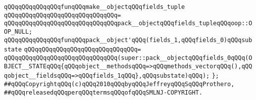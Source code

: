 \newline
\verb|qQQqqQQqqQQqqQQqfunqQQqmake__objectqQQqfields_tuple|\newline
\verb|qQQqqQQqqQQqqQQqqQQqqQQqqQQqqQQq=|\newline
\verb|qQQqqQQqqQQqqQQqqQQqqQQqqQQqqQQqpack__objectqQQqfields_tupleqQQqoop::OOP_NULL;|\newline
\newline
\verb|qQQqqQQqqQQqqQQqfunqQQqpack__object'qQQq(fields_1,qQQqfields_0)qQQqsubstate|\newline
\verb|qQQqqQQqqQQqqQQqqQQqqQQqqQQqqQQq=|\newline
\verb|qQQqqQQqqQQqqQQqqQQqqQQqqQQqqQQq(super::pack__objectqQQqfields_0qQQq(OBJECT__STATEqQQq{qQQqobject__methodsqQQq=>qQQqmethods_vectorqQQq(),qQQqobject__fieldsqQQq=>qQQqfields_1qQQq},qQQqsubstate)qQQq);|\newline
\newline
\verb|};|\newline
\newline
\newline
\verb|##qQQqCopyrightqQQq(c)qQQq2010qQQqbyqQQqJeffreyqQQqSqQQqProthero,|\newline
\verb|##qQQqreleasedqQQqperqQQqtermsqQQqofqQQqSMLNJ-COPYRIGHT.|\newline

